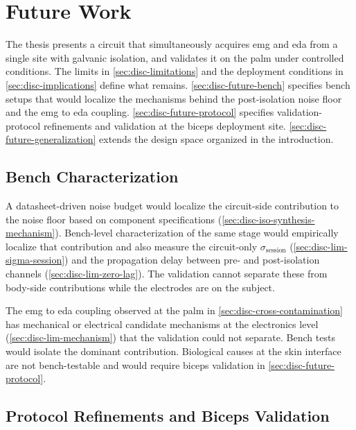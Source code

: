 \section{Future Work}
\label{sec:disc-future}

The thesis presents a circuit that simultaneously acquires \gls{emg} and \gls{eda} from a single site with galvanic isolation, and validates it on the palm under controlled conditions. The limits in \autoref{sec:disc-limitations} and the deployment conditions in \autoref{sec:disc-implications} define what remains. \autoref{sec:disc-future-bench} specifies bench setups that would localize the mechanisms behind the post-isolation noise floor and the \gls{emg} to \gls{eda} coupling. \autoref{sec:disc-future-protocol} specifies validation-protocol refinements and validation at the biceps deployment site. \autoref{sec:disc-future-generalization} extends the design space organized in the introduction.

\subsection{Bench Characterization}
\label{sec:disc-future-bench}

A datasheet-driven noise budget would localize the circuit-side contribution to the noise floor based on component specifications (\autoref{sec:disc-iso-synthesis-mechanism}). Bench-level characterization of the same stage would empirically localize that contribution and also measure the circuit-only $\sigma_\text{session}$ (\autoref{sec:disc-lim-sigma-session}) and the propagation delay between pre- and post-isolation channels (\autoref{sec:disc-lim-zero-lag}). The validation cannot separate these from body-side contributions while the electrodes are on the subject.

The \gls{emg} to \gls{eda} coupling observed at the palm in \autoref{sec:disc-cross-contamination} has mechanical or electrical candidate mechanisms at the electronics level (\autoref{sec:disc-lim-mechanism}) that the validation could not separate. Bench tests would isolate the dominant contribution. Biological causes at the skin interface are not bench-testable and would require biceps validation in \autoref{sec:disc-future-protocol}.

\subsection{Protocol Refinements and Biceps Validation}
\label{sec:disc-future-protocol}

